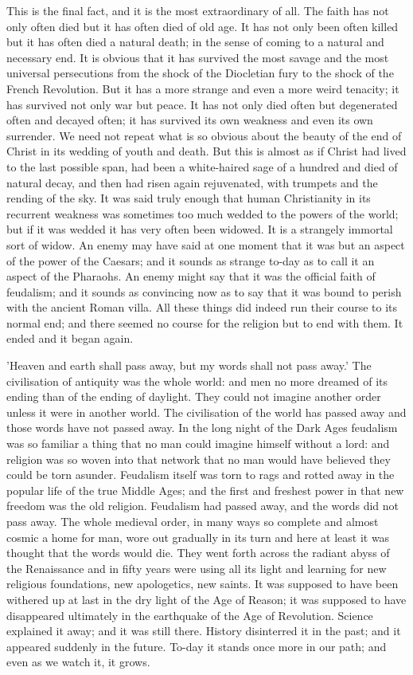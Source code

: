 This is the final fact, and it is the most extraordinary of all. The faith has not only often died but it has often died of old age. It has not only been often killed but it has often died a natural death; in the sense of coming to a natural and necessary end. It is obvious that it has survived the most savage and the most universal persecutions from the shock of the Diocletian fury to the shock of the French Revolution. But it has a more strange and even a more weird tenacity; it has survived not only war but peace. It has not only died often but degenerated often and decayed often; it has survived its own weakness and even its own surrender. We need not repeat what is so obvious about the beauty of the end of Christ in its wedding of youth and death. But this is almost as if Christ had lived to the last possible span, had been a white-haired sage of a hundred and died of natural decay, and then had risen again rejuvenated, with trumpets and the rending of the sky. It was said truly enough that human Christianity in its recurrent weakness was sometimes too much wedded to the powers of the world; but if it was wedded it has very often been widowed. It is a strangely immortal sort of widow. An enemy may have said at one moment that it was but an aspect of the power of the Caesars; and it sounds as strange to-day as to call it an aspect of the Pharaohs. An enemy might say that it was the official faith of feudalism; and it sounds as convincing now as to say that it was bound to perish with the ancient Roman villa. All these things did indeed run their course to its normal end; and there seemed no course for the religion but to end with them. It ended and it began again.

'Heaven and earth shall pass away, but my words shall not pass away.' The civilisation of antiquity was the whole world: and men no more dreamed of its ending than of the ending of daylight. They could not imagine another order unless it were in another world. The civilisation of the world has passed away and those words have not passed away. In the long night of the Dark Ages feudalism was so familiar a thing that no man could imagine himself without a lord: and religion was so woven into that network that no man would have believed they could be torn asunder. Feudalism itself was torn to rags and rotted away in the popular life of the true Middle Ages; and the first and freshest power in that new freedom was the old religion. Feudalism had passed away, and the words did not pass away. The whole medieval order, in many ways so complete and almost cosmic a home for man, wore out gradually in its turn and here at least it was thought that the words would die. They went forth across the radiant abyss of the Renaissance and in fifty years were using all its light and learning for new religious foundations, new apologetics, new saints. It was supposed to have been withered up at last in the dry light of the Age of Reason; it was supposed to have disappeared ultimately in the earthquake of the Age of Revolution. Science explained it away; and it was still there. History disinterred it in the past; and it appeared suddenly in the future. To-day it stands once more in our path; and even as we watch it, it grows.

